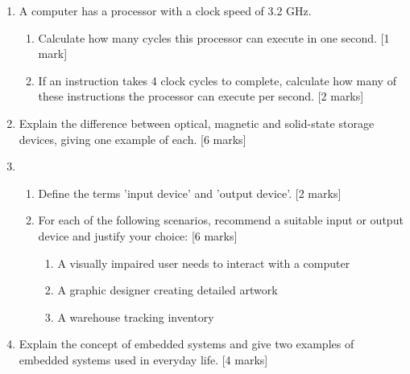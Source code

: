 \documentclass{article}
\begin{document}
\begin{enumerate}
\item A computer has a processor with a clock speed of 3.2 GHz.
\begin{enumerate}[label=(\alph*)]
    \item Calculate how many cycles this processor can execute in one second. [1 mark]
    \item If an instruction takes 4 clock cycles to complete, calculate how many of these instructions the processor can execute per second. [2 marks]
\end{enumerate}

\item Explain the difference between optical, magnetic and solid-state storage devices, giving one example of each. [6 marks]

\item 
\begin{enumerate}[label=(\alph*)]
    \item Define the terms 'input device' and 'output device'. [2 marks]
    \item For each of the following scenarios, recommend a suitable input or output device and justify your choice: [6 marks]
    \begin{enumerate}[label=(\roman*)]
        \item A visually impaired user needs to interact with a computer
        \item A graphic designer creating detailed artwork
        \item A warehouse tracking inventory
    \end{enumerate}
\end{enumerate}

\item Explain the concept of embedded systems and give two examples of embedded systems used in everyday life. [4 marks]

\end{enumerate}
\end{document}
